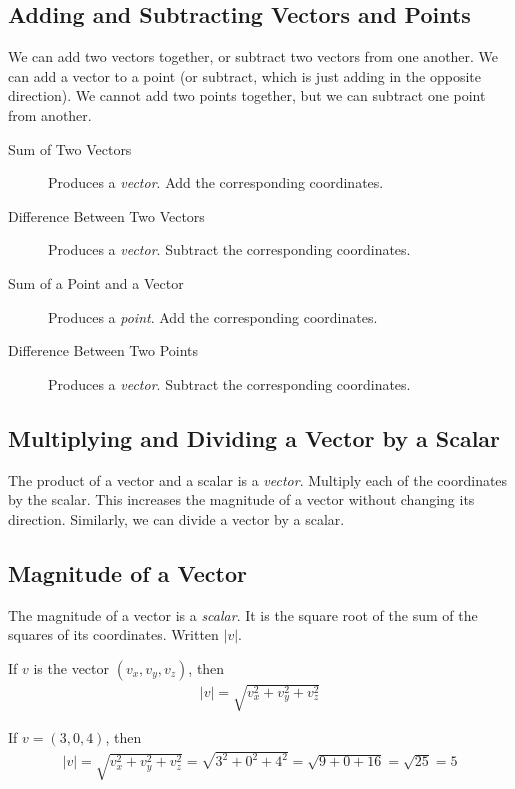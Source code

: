 \documentclass[../COS3712_Notes.tex]{subfiles}
\begin{document}
      \subsection{Adding and Subtracting Vectors and Points}
        We can add two vectors together, or subtract two vectors from one another.
        We can add a vector to a point (or subtract, which is just adding in the opposite direction).
        We cannot add two points together, but we can subtract one point from another.

        \begin{description}
          \item[Sum of Two Vectors] Produces a \emph{vector}.
            Add the corresponding coordinates.
          \item[Difference Between Two Vectors] Produces a \emph{vector}.
            Subtract the corresponding coordinates.
          \item[Sum of a Point and a Vector] Produces a \emph{point}.
            Add the corresponding coordinates.
          \item[Difference Between Two Points] Produces a \emph{vector}.
            Subtract the corresponding coordinates.
        \end{description}

      \subsection{Multiplying and Dividing a Vector by a Scalar}
        The product of a vector and a scalar is a \emph{vector}.
        Multiply each of the coordinates by the scalar.
        This increases the magnitude of a vector without changing its direction.
        Similarly, we can divide a vector by a scalar.

      \subsection{Magnitude of a Vector}
        The magnitude of a vector is a \emph{scalar}.
        It is the square root of the sum of the squares of its coordinates.
        Written $\lvert v \rvert$.

        If $v$ is the vector $(v_x, v_y, v_z)$, then 
        \begin{align*}
          \lvert v \rvert = \sqrt{v_x^2 + v_y^2 + v_z^2}
        \end{align*}

        \begin{example}
          If $v = (3, 0, 4)$, then
          \begin{align*}
            \lvert v \rvert = \sqrt{v_x^2 + v_y^2 + v_z^2}
                            = \sqrt{3^2 + 0^2 + 4^2}
                            = \sqrt{9 + 0 + 16} = \sqrt{25} = 5
          \end{align*}
        \end{example}
\end{document}
